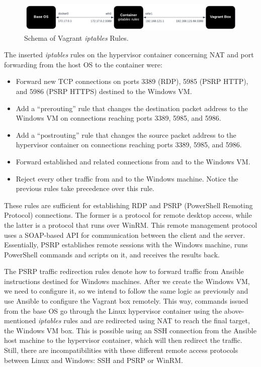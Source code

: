 \begin{figure}[H]
    \includegraphics[width=13cm]{figures/vagrant_iptables_rules.pdf}
    \caption{Schema of Vagrant \textit{iptables} Rules.}
    \label{fig:vagrant_iptables_rules}
\end{figure}

The inserted \textit{iptables} rules on the hypervisor container concerning NAT and port forwarding from the host OS to the container were:

\begin{itemize}
    \item Forward new TCP connections on ports 3389 (RDP), 5985 (PSRP HTTP), and 5986 (PSRP HTTPS) destined to the Windows VM.
    \item Add a ``prerouting'' rule that changes the destination packet address to the Windows VM on connections reaching ports 3389, 5985, and 5986.
    \item Add a ``postrouting'' rule that changes the source packet address to the hypervisor container on connections reaching ports 3389, 5985, and 5986.
    \item Forward established and related connections from and to the Windows VM.
    \item Reject every other traffic from and to the Windows machine. Notice the previous rules take precedence over this rule.
\end{itemize}

These rules are sufficient for establishing RDP and PSRP (PowerShell Remoting Protocol) connections. The former is a protocol for remote desktop access, while the latter is a protocol that runs over WinRM. This remote management protocol uses a SOAP-based API for communication between the client and the server. Essentially, PSRP establishes remote sessions with the Windows machine, runs PowerShell commands and scripts on it, and receives the results back.


The PSRP traffic redirection rules denote how to forward traffic from Ansible instructions destined for Windows machines. After we create the Windows VM, we need to configure it, so we intend to follow the same logic as previously and use Ansible to configure the Vagrant box remotely. This way, commands issued from the base OS go through the Linux hypervisor container using the above-mentioned \textit{iptables} rules and are redirected using NAT to reach the final target, the Windows VM box. This is possible using an SSH connection from the Ansible host machine to the hypervisor container, which will then redirect the traffic. Still, there are incompatibilities with these different remote access protocols between Linux and Windows: SSH and PSRP or WinRM. 

